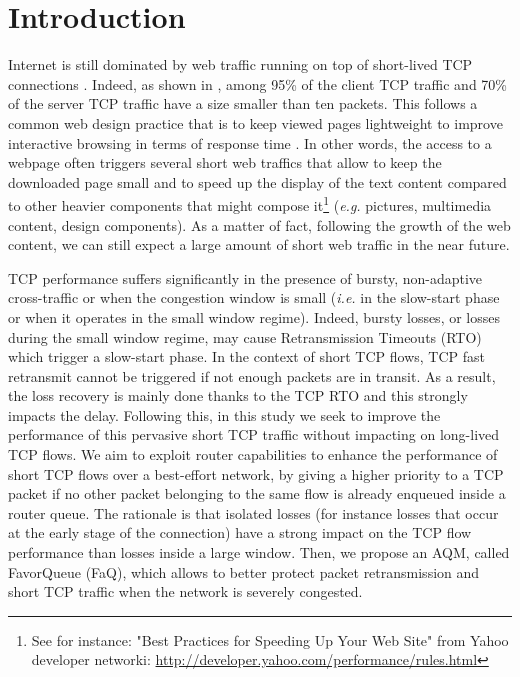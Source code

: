 \documentclass{elsart}
\begin{document}
\section{Introduction}
\label{sec:intro}

Internet is still dominated by web traffic running on top of short-lived TCP connections \cite{IOR2009}. Indeed, as shown in \cite{ciullo09}, among 95\% of the client TCP traffic and 70\% of the server TCP traffic have a size smaller than ten packets. This follows a common web design practice that is to keep viewed pages lightweight to improve interactive browsing in terms of response time \cite{chen03}. In other words, the access to a webpage often triggers several short web traffics that allow to keep the downloaded page small and to speed up the display of the text content compared to other heavier components that might compose it\footnote{See for instance: "Best Practices for Speeding Up Your Web Site" from Yahoo developer networki: \url{http://developer.yahoo.com/performance/rules.html}} (\textit{e.g.} pictures, multimedia content, design components). As a matter of fact, following the growth of the web content, we can still expect a large amount of short web traffic in the near future. 

TCP performance suffers significantly in the presence of bursty, non-adaptive cross-traffic or when the congestion window is small (\textit{i.e.} in the slow-start phase or when it operates in the small window regime).  
Indeed, bursty losses, or losses during the small window regime, may cause Retransmission Timeouts (RTO) which trigger a slow-start phase. In the context of short TCP flows, TCP fast retransmit cannot be triggered if not enough packets are in transit. As a result, the loss recovery is mainly done thanks to the TCP RTO and this strongly impacts the delay.
Following this, in this study we seek to improve the performance of this pervasive short TCP traffic without impacting on long-lived TCP flows. We aim to exploit router capabilities to enhance the performance of short TCP flows over a best-effort network, by giving a higher priority to a TCP packet if no other packet belonging to the same flow is already enqueued inside a router queue. The rationale is that isolated losses (for instance losses that occur at the early stage of the connection) have a strong impact on the TCP flow performance than losses inside a large window. Then, we propose an AQM, called FavorQueue (FaQ), which allows to better protect packet retransmission and short TCP traffic when the network is severely congested.
\end{document}
